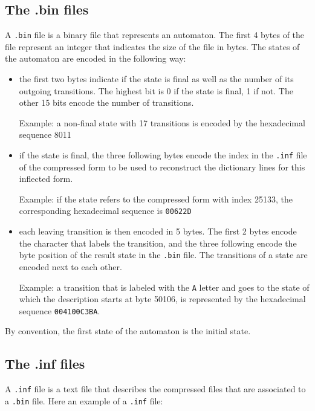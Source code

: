 \subsection{The .bin files}
A \verb$.bin$ file is a binary file that represents an automaton. The first 4
bytes of the file represent an integer that indicates the size of the file in
bytes. The states of the automaton are encoded in the following way:
\begin{itemize}

  \item the first two bytes indicate if the state is final as well as the number
  of its outgoing transitions. The highest bit is 0 if the state is final, 1 if
  not. The other 15 bits encode the number of transitions.

  \bigskip Example: a non-final state with 17 transitions is encoded by the
  hexadecimal sequence 8011
  

  \bigskip \item if the state is final, the three following bytes encode the
  index in the \verb+.inf+ file of the compressed form to be used to reconstruct
  the dictionary lines for this inflected form.

  
  \bigskip Example: if the state refers to the compressed form with index 25133,
  the corresponding hexadecimal sequence is \verb+00622D+
  

  \bigskip \item each leaving transition is then encoded in 5 bytes. The first 2
  bytes encode the character that labels the transition, and the three following
  encode the byte position of the result state in the \verb+.bin+ file. The
  transitions of a state are encoded next to each other.

  \bigskip Example: a transition that is labeled with the \verb+A+ letter and
  goes to the state of which the description starts at byte 50106, is represented
  by the hexadecimal sequence \verb+004100C3BA+.

\end{itemize}

\bigskip
\noindent By convention, the first state of the automaton is the initial state.

\subsection{The .inf files}
A \verb+.inf+ file is a text file that describes the compressed files that are
associated to a \verb+.bin+ file. Here an example of a \verb+.inf+ file:

